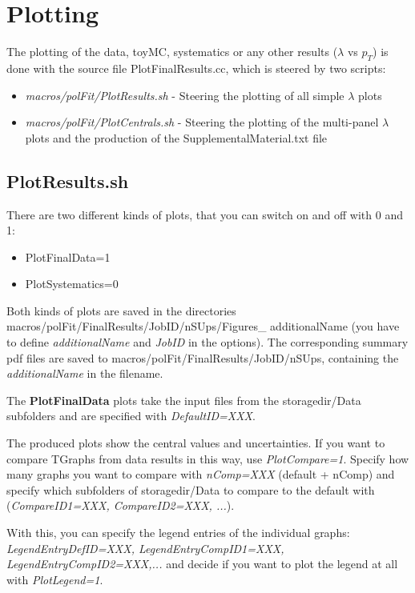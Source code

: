\documentclass{article}
\begin{document}
\section{Plotting}

The plotting of the data, toyMC, systematics or any other results ($\lambda$ vs $p_T$) is done with the source file PlotFinalResults.cc, which is steered by two scripts:
\begin{itemize}
\item{\emph{macros/polFit/PlotResults.sh} - Steering the plotting of all simple $\lambda$ plots}
\item{\emph{macros/polFit/PlotCentrals.sh} - Steering the plotting of the multi-panel $\lambda$ plots and the production of the SupplementalMaterial.txt file}
\end{itemize}


\subsection*{PlotResults.sh}

There are two different kinds of plots, that you can switch on and off with 0 and 1:
\begin{itemize}
\item PlotFinalData=1
\item PlotSystematics=0
\end{itemize}
Both kinds of plots are saved in the directories macros/polFit/FinalResults/JobID/nSUps/Figures\_ additionalName (you have to define \emph{additionalName} and \emph{JobID} in the options). The corresponding summary pdf files are saved to macros/polFit/FinalResults/JobID/nSUps, containing the \emph{additionalName} in the filename.

The {\bf PlotFinalData} plots take the input files from the storagedir/Data subfolders and are specified with  \emph{DefaultID=XXX}.

The produced plots show the central values and uncertainties. If you want to compare TGraphs from data results in this way, use \emph{PlotCompare=1}. Specify how many graphs you want to compare with
\emph{nComp=XXX} (default + nComp) and specify which subfolders of storagedir/Data to compare to the default with (\emph{CompareID1=XXX, CompareID2=XXX, ...}).

With this, you can specify the legend entries of the individual graphs: \emph{LegendEntryDefID=XXX, LegendEntryCompID1=XXX, LegendEntryCompID2=XXX,...} and decide if you want to plot the legend at all with
\emph{PlotLegend=1}.
\end{document}
